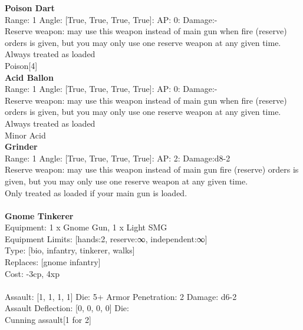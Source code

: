 {\bf Poison Dart } \\



Range: 1  Angle: [True, True, True, True]: AP: 0: Damage:- \\
Reserve weapon: may use this weapon instead of main gun when fire (reserve) orders is given, but you may only use one reserve weapon at any given time.\\ 
Always treated as loaded\\ 
Poison[4]\\ 




{\bf Acid Ballon } \\



Range: 1  Angle: [True, True, True, True]: AP: 0: Damage:- \\
Reserve weapon: may use this weapon instead of main gun when fire (reserve) orders is given, but you may only use one reserve weapon at any given time.\\ 
Always treated as loaded\\ 
Minor Acid\\ 




{\bf Grinder } \\



Range: 1  Angle: [True, True, True, True]: AP: 2: Damage:d8-2 \\
Reserve weapon: may use this weapon instead of main gun fire (reserve) orders is given, but you may only use one reserve weapon at any given time.\\ 
Only treated as loaded if your main gun is loaded.\\ 




 
\ \\

{\bf Gnome Tinkerer } \\
Equipment: 1 x Gnome Gun, 1 x Light SMG \\
Equipment Limits: [hands:2, reserve:∞, independent:∞] \\
Type: [bio, infantry, tinkerer, walks] \\
Replaces: [gnome infantry] \\
Cost: -3cp, 4xp\\
\ \\
Assault: [1, 1, 1, 1] Die: 5+ Armor Penetration: 2 Damage: d6-2 \\
Assault Deflection: [0, 0, 0, 0] Die: \\
\indent Cunning assault[1 for 2]\\ 
 
